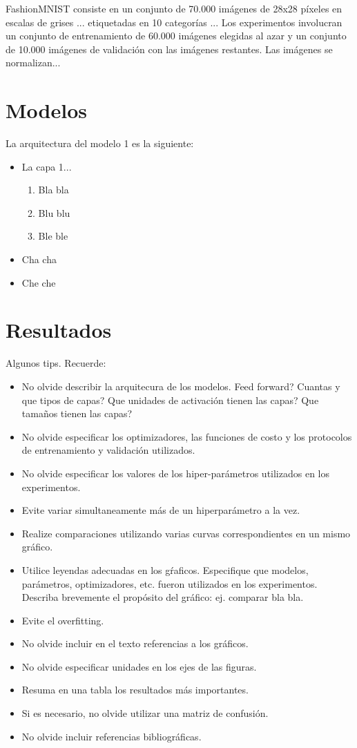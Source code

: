 \documentclass[aps,prl,preprint,groupedaddress]{revtex4-2}
\begin{document}
FashionMNIST consiste en un conjunto de 70.000 imágenes de 28x28 píxeles en escalas de grises ... etiquetadas en 10 categorías ...
Los experimentos involucran un conjunto de entrenamiento de 60.000 imágenes elegidas al azar y un conjunto de 10.000 imágenes de validación con las imágenes restantes.
Las imágenes se normalizan...

\section{Modelos}

La arquitectura del modelo 1 es la siguiente:
\begin{itemize}
    \item La capa 1...
    \begin{enumerate}
        \item Bla bla
        \item Blu blu
        \item Ble ble
    \end{enumerate}
    \item Cha cha
    \item Che che
\end{itemize}

\section{Resultados}

{\color{red}
Algunos tips. Recuerde:
\begin{itemize}
\item No olvide describir la arquitecura de los modelos. Feed forward? Cuantas y que tipos de capas? Que unidades de activación tienen las capas? Que tamaños tienen las capas?
\item No olvide especificar los optimizadores, las funciones de costo y los protocolos de entrenamiento y validación utilizados.
\item No olvide especificar los valores de los hiper-parámetros utilizados en los experimentos.
\item Evite variar simultaneamente más de un hiperparámetro a la vez.
\item Realize comparaciones utilizando varias curvas correspondientes en un mismo gráfico.
\item Utilice leyendas adecuadas en los gŕaficos. Especifique que modelos, parámetros, optimizadores, etc. fueron utilizados en los experimentos. Describa brevemente el propósito del gráfico: ej. comparar bla bla.
\item Evite el overfitting.
\item No olvide incluir en el texto referencias a los gráficos.
\item No olvide especificar unidades en los ejes de las figuras.
\item Resuma en una tabla los resultados más importantes.
\item Si es necesario, no olvide utilizar una matriz de confusión.
\item No olvide incluir referencias bibliográficas.
\end{itemize}
}
\end{document}
